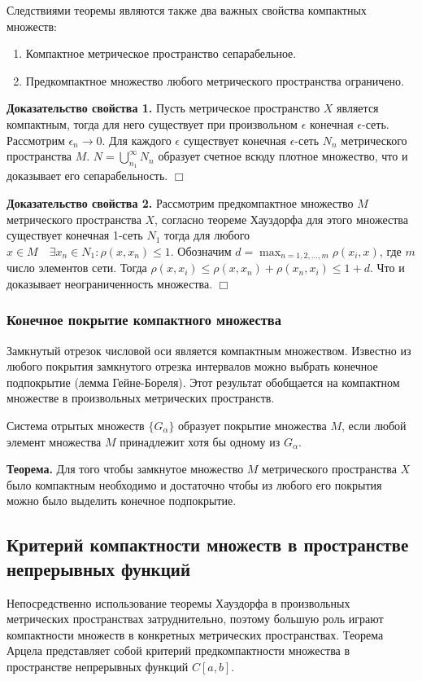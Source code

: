 \documentclass[14pt,a4paper]{extarticle}
\theoremstyle{definition}
\theoremstyle{remark}
\renewcommand{\[}{\begin{dmath*}[compact]}
\renewcommand{\]}{\end{dmath*}}
\newcommand{\be}{\begin{enumerate}}
\newcommand{\ee}{\end{enumerate}}
\newcommand{\tth}[1][]{\textbf{Теорема#1.}}
\newcommand{\btev}[1][]{\textbf{Доказательство#1.}
}
\newcommand{\etev}{$\Box$}
\begin{document}
Следствиями теоремы являются также два важных свойства компактных множеств:

\be
  \item Компактное метрическое пространство сепарабельное.
  \item Предкомпактное множество любого метрического пространства ограничено.
\ee

\btev[ свойства 1] Пусть метрическое пространство $X$ является компактным, тогда для него существует при произвольном $\epsilon$ конечная $\epsilon$-сеть. Рассмотрим $\epsilon_n \to 0$. Для каждого $\epsilon$ существует конечная $\epsilon$-сеть $N_n$ метрического пространства $M$. $N=\bigcup _{n_1}^{\infty} N_n$ образует счетное всюду плотное множество, что и доказывает его сепарабельность. \etev

\btev[ свойства 2] Рассмотрим предкомпактное множество $M$ метрического пространства $X$, согласно теореме Хауздорфа для этого множества существует конечная 1-сеть $N_1$ тогда для любого $x \in M\quad \exists x_n \in N_1: \rho(x, x_n) \leq 1$. Обозначим $d=\max_{n=1,2,\dots,m}\rho(x_i,x)$, где $m$ число элементов сети. Тогда $\rho(x, x_i) \leq \rho(x, x_n)+\rho(x_n, x_i) \leq 1+d$. Что и доказывает неограниченность множества. \etev

\subsubsection{Конечное покрытие компактного множества}

Замкнутый отрезок числовой оси является компактным множеством. Известно из любого покрытия замкнутого отрезка интервалов можно выбрать конечное подпокрытие (лемма Гейне-Бореля). Этот результат обобщается на компактном множестве в произвольных метрических пространств.

Система отрытых множеств $\{G_\alpha\}$ образует покрытие множества $M$, если любой элемент множества $M$ принадлежит хотя бы одному из $G_\alpha$.

\tth[] Для того чтобы замкнутое множество $M$ метрического пространства $X$ было компактным необходимо и достаточно чтобы из любого его покрытия можно было выделить конечное подпокрытие.

\subsection{Критерий компактности множеств в пространстве непрерывных функций}

Непосредственно использование теоремы Хауздорфа в произвольных метрических пространствах затруднительно, поэтому большую роль играют компактности множеств в конкретных метрических пространствах. Теорема Арцела представляет собой критерий предкомпактности множества в пространстве непрерывных функций $C[a,b]$.
\end{document}
